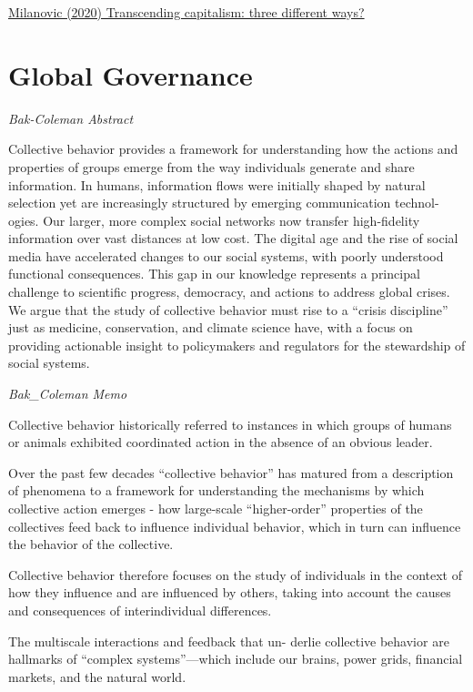 \documentclass[
]{book}
\begin{document}
\href{http://glineq.blogspot.com/2020/02/transcending-capitalism-three-different.html}{Milanovic (2020) Transcending capitalism: three different ways?}

\hypertarget{global-governance}{%
\section{Global Governance}\label{global-governance}}

\emph{Bak-Coleman Abstract}

Collective behavior provides a framework for understanding how the actions and properties of groups
emerge from the way individuals generate and share information. In humans, information flows were
initially shaped by natural selection yet are increasingly structured by emerging communication technol-
ogies. Our larger, more complex social networks now transfer high-fidelity information over vast distances
at low cost. The digital age and the rise of social media have accelerated changes to our social systems, with
poorly understood functional consequences. This gap in our knowledge represents a principal challenge to
scientific progress, democracy, and actions to address global crises. We argue that the study of collective
behavior must rise to a ``crisis discipline'' just as medicine, conservation, and climate science have, with a
focus on providing actionable insight to policymakers and regulators for the stewardship of social systems.

\emph{Bak\_Coleman Memo}

Collective behavior historically referred to instances in
which groups of humans or animals exhibited coordinated
action in the absence of an obvious leader.

Over the past few decades ``collective behavior''
has matured from a description of phenomena to a
framework for understanding the mechanisms by
which collective action emerges
- how
large-scale ``higher-order'' properties of the collectives
feed back to influence individual behavior, which
in turn can influence the behavior of the collective.

Collective behavior therefore focuses on
the study of individuals in the context of how they
influence and are influenced by others, taking into account
the causes and consequences of interindividual
differences.

The multiscale interactions and feedback that un-
derlie collective behavior are hallmarks of ``complex
systems''---which include our brains, power grids,
financial markets, and the natural world.
\end{document}
